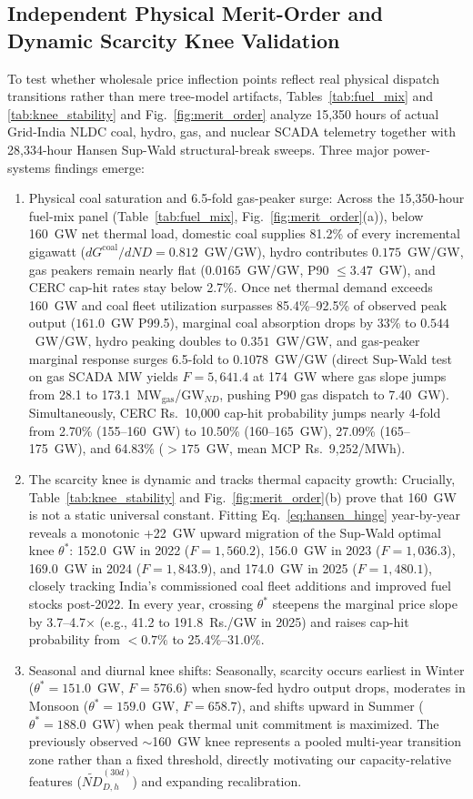 \documentclass[runningheads,a4paper]{llncs}
\begin{document}
\subsection{Independent Physical Merit-Order and Dynamic Scarcity Knee Validation}
To test whether wholesale price inflection points reflect real physical dispatch transitions rather than mere tree-model artifacts, Tables~\ref{tab:fuel_mix} and \ref{tab:knee_stability} and Fig.~\ref{fig:merit_order} analyze 15,350 hours of actual Grid-India NLDC coal, hydro, gas, and nuclear SCADA telemetry together with 28,334-hour Hansen Sup-Wald structural-break sweeps. Three major power-systems findings emerge:
\begin{enumerate}
    \item Physical coal saturation and 6.5-fold gas-peaker surge: Across the 15,350-hour fuel-mix panel (Table~\ref{tab:fuel_mix}, Fig.~\ref{fig:merit_order}(a)), below 160~GW net thermal load, domestic coal supplies 81.2\% of every incremental gigawatt ($dG^{\text{coal}}/dND = 0.812$~GW/GW), hydro contributes $0.175$~GW/GW, gas peakers remain nearly flat ($0.0165$~GW/GW, P90 $\le 3.47$~GW), and CERC cap-hit rates stay below 2.7\%. Once net thermal demand exceeds 160~GW and coal fleet utilization surpasses 85.4\%--92.5\% of observed peak output ($161.0$~GW P99.5), marginal coal absorption drops by 33\% to $0.544$~GW/GW, hydro peaking doubles to $0.351$~GW/GW, and gas-peaker marginal response surges 6.5-fold to $0.1078$~GW/GW (direct Sup-Wald test on gas SCADA MW yields $F = 5,641.4$ at 174~GW where gas slope jumps from 28.1 to 173.1~MW$_{\text{gas}}$/GW$_{ND}$, pushing P90 gas dispatch to 7.40~GW). Simultaneously, CERC Rs.~10,000 cap-hit probability jumps nearly 4-fold from 2.70\% (155--160~GW) to 10.50\% (160--165~GW), 27.09\% (165--175~GW), and 64.83\% ($>175$~GW, mean MCP Rs.~9,252/MWh).
    \item The scarcity knee is dynamic and tracks thermal capacity growth: Crucially, Table~\ref{tab:knee_stability} and Fig.~\ref{fig:merit_order}(b) prove that 160~GW is not a static universal constant. Fitting Eq.~\ref{eq:hansen_hinge} year-by-year reveals a monotonic +22~GW upward migration of the Sup-Wald optimal knee $\theta^*$: 152.0~GW in 2022 ($F=1,560.2$), 156.0~GW in 2023 ($F=1,036.3$), 169.0~GW in 2024 ($F=1,843.9$), and 174.0~GW in 2025 ($F=1,480.1$), closely tracking India's commissioned coal fleet additions and improved fuel stocks post-2022. In every year, crossing $\theta^*$ steepens the marginal price slope by 3.7--4.7$\times$ (e.g., 41.2 to 191.8~Rs./GW in 2025) and raises cap-hit probability from $<0.7\%$ to 25.4\%--31.0\%.
    \item Seasonal and diurnal knee shifts: Seasonally, scarcity occurs earliest in Winter ($\theta^* = 151.0$~GW, $F=576.6$) when snow-fed hydro output drops, moderates in Monsoon ($\theta^* = 159.0$~GW, $F=658.7$), and shifts upward in Summer ($\theta^* = 188.0$~GW) when peak thermal unit commitment is maximized. The previously observed $\sim$160~GW knee represents a pooled multi-year transition zone rather than a fixed threshold, directly motivating our capacity-relative features ($\widetilde{ND}_{D,h}^{(30d)}$) and expanding recalibration.
\end{enumerate}
\end{document}

